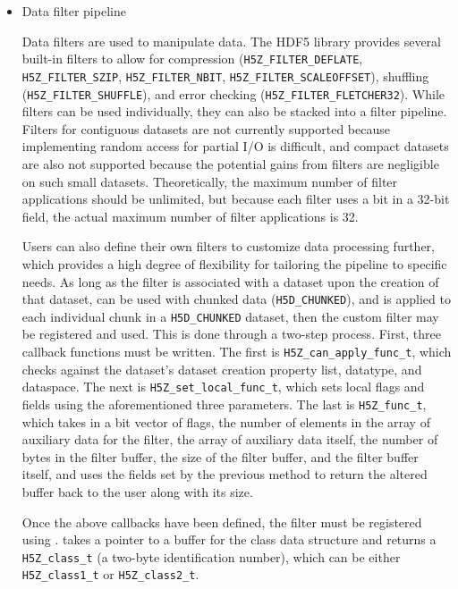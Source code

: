 \begin{itemize}
    \item Data filter pipeline

Data filters are used to manipulate data. The HDF5 library provides several built-in filters to allow for compression ({\footnotesize\texttt{H5Z\_FILTER\_DEFLATE}, \texttt{H5Z\_FILTER\_SZIP}, \texttt{H5Z\_FILTER\_NBIT}, \texttt{H5Z\_FILTER\_SCALEOFFSET}}), shuffling ({\footnotesize\texttt{H5Z\_FILTER\_SHUFFLE}}), and error checking ({\footnotesize\texttt{H5Z\_FILTER\_FLETCHER32}}). While filters can be used individually, they can also be stacked into a filter pipeline. Filters for contiguous datasets are not currently supported because implementing random access for partial I/O is difficult, and compact datasets are also not supported because the potential gains from filters are negligible on such small datasets. Theoretically, the maximum number of filter applications should be unlimited, but because each filter uses a bit in a 32-bit field, the actual maximum number of filter applications is 32.

Users can also define their own filters to customize data processing further, which provides a high degree of flexibility for tailoring the pipeline to specific needs. As long as the filter is associated with a dataset upon the creation of that dataset, can be used with chunked data (\texttt{H5D\_CHUNKED}), and is applied to each individual chunk in a \texttt{H5D\_CHUNKED} dataset, then the custom filter may be registered and used. This is done through a two-step process. First, three callback functions must be written. The first is \texttt{H5Z\_can\_apply\_func\_t}, which checks against the dataset's dataset creation property list, datatype, and dataspace. The next is \texttt{H5Z\_set\_local\_func\_t}, which sets local flags and fields using the aforementioned three parameters. The last is \texttt{H5Z\_func\_t}, which takes in a bit vector of flags, the number of elements in the array of auxiliary data for the filter, the array of auxiliary data itself, the number of bytes in the filter buffer, the size of the filter buffer, and the filter buffer itself, and uses the fields set by the previous method to return the altered buffer back to the user along with its size.

Once the above callbacks have been defined, the filter must be registered using .  takes a pointer to a buffer for the class data structure and returns a \texttt{H5Z\_class\_t} (a two-byte identification number), which can be either \texttt{H5Z\_class1\_t} or \texttt{H5Z\_class2\_t}.


\end{itemize}
